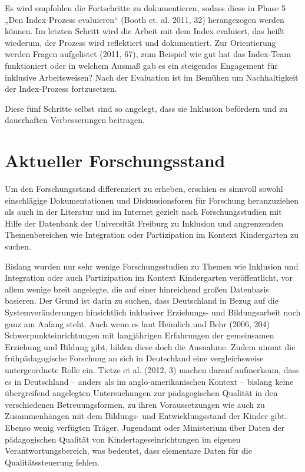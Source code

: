 Es wird empfohlen die Fortschritte zu dokumentieren, sodass diese in Phase 5 „Den Index-Prozess evaluieren“ (Booth et. al. 2011, 32) herangezogen werden können. Im letzten Schritt wird die Arbeit mit dem Index evaluiert, das heißt wiederum, der Prozess wird reflektiert und dokumentiert. Zur Orientierung werden Fragen aufgelistet (2011, 67), zum Beispiel wie gut hat das Index-Team funktioniert oder in welchem Ausmaß gab es ein steigendes Engagement für inklusive Arbeitsweisen? Nach der Evaluation ist im Bemühen um Nachhaltigkeit der Index-Prozess fortzusetzen. 
  
Diese fünf Schritte selbst sind so angelegt, dass sie Inklusion befördern und zu dauerhaften Verbesserungen beitragen.

\chapter{Aktueller Forschungsstand}\label{Forschung}
Um den Forschungsstand differenziert zu erheben, erschien es sinnvoll sowohl einschlägige Dokumentationen und Diskussionsforen für Forschung heranzuziehen als auch in der Literatur und im Internet gezielt nach Forschungsstudien mit Hilfe der Datenbank der Universität Freiburg zu Inklusion und angrenzenden Themenbereichen wie Integration oder Partizipation im Kontext Kindergarten zu suchen.

Bislang wurden nur sehr wenige Forschungsstudien zu Themen wie Inklusion und Integration oder auch Partizipation im Kontext Kindergarten veröffentlicht, vor allem wenige breit angelegte, die auf einer hinreichend großen Datenbasis basieren. Der Grund ist darin zu suchen, dass Deutschland in Bezug auf die Systemveränderungen hinsichtlich inklusiver Erziehungs- und Bildungsarbeit noch ganz am Anfang steht. Auch wenn es laut Heimlich und Behr (2006, 204) Schwerpunkteinrichtungen mit langjährigen Erfahrungen der gemeinsamen Erziehung und Bildung gibt, bilden diese doch die Ausnahme.  
Zudem nimmt die frühpädagogische Forschung an sich in Deutschland eine vergleichsweise untergeordnete Rolle ein. 
Tietze et al. (2012, 3) machen darauf aufmerksam, dass es in Deutschland – anders als im anglo-amerikanischen Kontext – bislang keine übergreifend angelegten Untersuchungen zur pädagogischen Qualität in den verschiedenen Betreuungsformen, zu ihren Voraussetzungen wie auch zu Zusammenhängen mit dem Bildungs- und Entwicklungsstand der Kinder gibt. Ebenso wenig verfügten Träger, Jugendamt oder Ministerium über Daten der pädagogischen Qualität von Kindertageseinrichtungen im eigenen Verantwortungsbereich, was bedeutet, dass elementare Daten für die Qualitätssteuerung fehlen.


